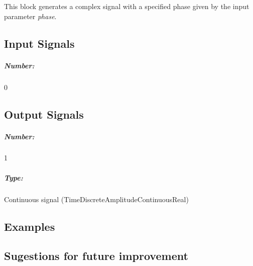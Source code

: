 This block generates a complex signal with a specified phase given by the input parameter \textit{phase}.

\pagebreak
\subsection*{Input Signals}

\subparagraph*{Number:} 0

\subsection*{Output Signals}

\subparagraph*{Number:} 1

\subparagraph*{Type:} Continuous signal (TimeDiscreteAmplitudeContinuousReal)

\subsection*{Examples}

\subsection*{Sugestions for future improvement}



